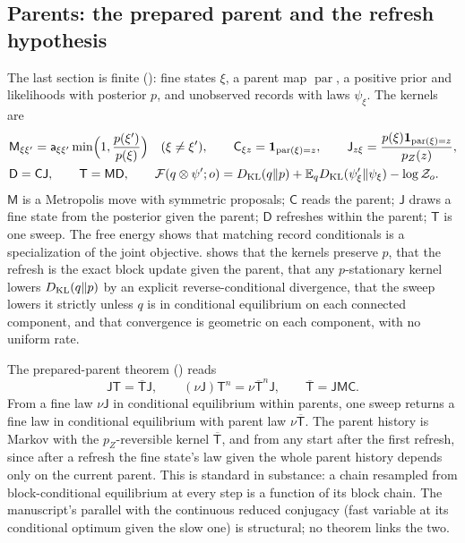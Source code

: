 \subsection{Parents: the prepared parent and the refresh hypothesis}
\label{comp:ch08-formulas-parent}

The last section is finite (): fine states $\xi$, a parent map
$\operatorname{par}$, a positive prior and likelihoods with posterior $p$, and unobserved records with
laws $\psi_\xi$. The kernels are
\begin{align*}
&\mathsf M_{\xi\xi'}=\mathsf a_{\xi\xi'}\min\Bigl(1,\frac{p(\xi')}{p(\xi)}\Bigr)\quad(\xi\neq\xi'),
\qquad
\mathsf C_{\xi z}=\mathbf 1_{\operatorname{par}(\xi)=z},
\qquad
\mathsf J_{z\xi}=\frac{p(\xi)\mathbf 1_{\operatorname{par}(\xi)=z}}{p_Z(z)},
\\
&\mathsf D=\mathsf C\mathsf J,
\qquad
\mathsf T=\mathsf M\mathsf D,
\qquad
\mathcal F(q\otimes\psi';o)=D_{\mathrm{KL}}(q\Vert p)+\mathbb E_qD_{\mathrm{KL}}(\psi'_\xi\Vert\psi_\xi)-\log\mathcal Z_o .
\end{align*}
$\mathsf M$ is a Metropolis move with symmetric proposals; $\mathsf C$ reads the parent; $\mathsf J$
draws a fine state from the posterior given the parent; $\mathsf D$ refreshes within the parent;
$\mathsf T$ is one sweep. The free energy shows that matching record conditionals is a specialization
of the joint objective.  shows that the kernels preserve $p$, that
the refresh is the exact block update given the parent, that any $p$-stationary kernel lowers
$D_{\mathrm{KL}}(q\Vert p)$ by an explicit reverse-conditional divergence, that the sweep lowers it strictly unless
$q$ is in conditional equilibrium on each connected component, and that convergence is geometric on
each component, with no uniform rate.

The prepared-parent theorem () reads
\[
\mathsf J\mathsf T=\overline{\mathsf T}\mathsf J,
\qquad
(\nu\mathsf J)\mathsf T^n=\nu\overline{\mathsf T}^n\mathsf J,
\qquad
\overline{\mathsf T}=\mathsf J\mathsf M\mathsf C .
\]
From a fine law $\nu\mathsf J$ in conditional equilibrium within parents, one sweep returns a fine law
in conditional equilibrium with parent law $\nu\overline{\mathsf T}$. The parent history is Markov with
the $p_Z$-reversible kernel $\overline{\mathsf T}$, and from any start after the first refresh, since
after a refresh the fine state's law given the whole parent history depends only on the current parent.
This is standard in substance: a chain resampled from block-conditional equilibrium at every step is a
function of its block chain. The manuscript's parallel with the continuous reduced conjugacy (fast
variable at its conditional optimum given the slow one) is structural; no theorem links the two.

